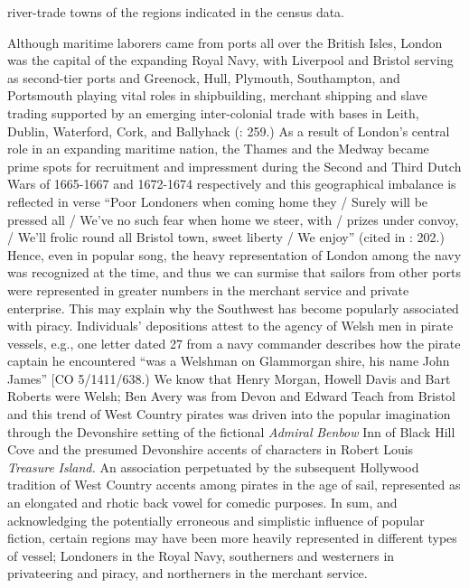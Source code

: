river-trade towns of the regions indicated in the census data. 


Although maritime laborers came from ports all over the British Isles, London was the capital of the expanding Royal Navy, with Liverpool and Bristol serving as second-tier ports and Greenock, Hull, Plymouth, Southampton, and Portsmouth playing vital roles in shipbuilding, merchant shipping and slave trading supported by an emerging inter-colonial trade with bases in Leith, Dublin, Waterford, Cork, and Ballyhack (\citealt{Jarvis2010}: 259.) As a result of London’s central role in an expanding maritime nation, the Thames and the Medway became prime spots for recruitment and impressment during the Second and Third Dutch Wars of 1665-1667 and 1672-1674 respectively \citep[201,]{Earle1998} and this geographical imbalance is reflected in verse “Poor Londoners when coming home they / Surely will be pressed all / We’ve no such fear when home we steer, with / prizes under convoy, / We’ll frolic round all Bristol town, sweet liberty / We enjoy” (cited in \citealt{Earle1998}: 202.) Hence, even in popular song, the heavy representation of London among the navy was recognized at the time, and thus we can surmise that sailors from other ports were represented in greater numbers in the merchant service and private enterprise. This may explain why the Southwest has become popularly associated with piracy. Individuals’ depositions attest to the agency of Welsh men in pirate vessels, e.g., one letter dated 27 \citealt{July1699} from a navy commander describes how the pirate captain he encountered “was a Welshman on Glammorgan shire, his name John James” [CO 5/1411/638.) We know that Henry Morgan, Howell Davis and Bart Roberts were Welsh; Ben Avery was from Devon and Edward Teach from Bristol \citep[328,]{Bicheno2012} and this trend of West Country pirates was driven into the popular imagination through the Devonshire setting of the fictional \textit{Admiral} \textit{Benbow} Inn of Black Hill Cove and the presumed Devonshire accents of characters in Robert Louis  \textit{Treasure} \textit{Island.} An association perpetuated by the subsequent Hollywood tradition of West Country accents among pirates in the age of sail, represented as an elongated and rhotic back vowel for comedic purposes. In sum, and acknowledging the potentially erroneous and simplistic influence of popular fiction, certain regions may have been more heavily represented in different types of vessel; Londoners in the Royal Navy, southerners and westerners in privateering and piracy, and northerners in the merchant service. 

